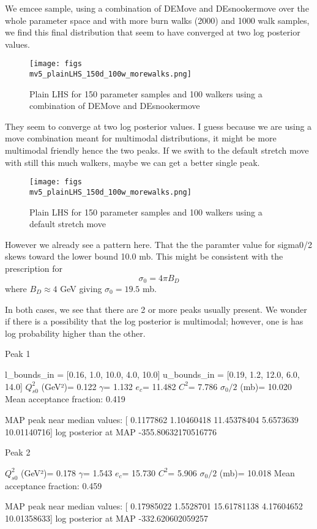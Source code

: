 \documentclass{article}
\begin{document}
We emcee sample, using a combination of DEMove and DEsnookermove over the whole parameter space and with more burn walks (2000) and 1000 walk samples, we find this final distribution that seem to have converged at two log posterior values. 

\begin{figure}
\centering
\texttt{[image: figs\\mv5\_plainLHS\_150d\_100w\_morewalks.png]}
\caption{Plain LHS for 150 parameter samples and 100 walkers using a combination of DEMove and DEsnookermove}
\end{figure}

They seem to converge at two log posterior values. I guess because we are using a move combination meant for multimodal distributions, it might be more multimodal friendly hence the two peaks. If we swith to the default stretch move with still this much walkers, maybe we can get a better single peak. 

\begin{figure}
\centering
\texttt{[image: figs\\mv5\_plainLHS\_150d\_100w\_morewalks.png]}
\caption{Plain LHS for 150 parameter samples and 100 walkers using a default stretch move}
\end{figure}

However we already see a pattern here. That the the paramter value for sigma0/2 skews toward the lower bound 10.0 mb. This might be consistent with the prescription for $$ \sigma_0 = 4\pi B_D $$ where $B_D \approx 4$ GeV giving $ \sigma_0 = 19.5 $ mb.

In both cases, we see that there are 2 or more peaks usually present. We wonder if there is a possibility that the log posterior is multimodal; however, one is has log probability higher than the other. 

Peak 1

l_bounds_in = [0.16, 1.0, 10.0, 4.0, 10.0] 
u_bounds_in = [0.19, 1.2, 12.0, 6.0, 14.0]
$Q_{s0}^{2}$ (GeV²)= 0.122
$\gamma$= 1.132
$e_c$= 11.482
$C^{2}$= 7.786
$\sigma_0/2$ (mb)= 10.020
Mean acceptance fraction: 0.419

MAP peak near median values: [ 0.1177862   1.10460418 11.45378404  5.6573639  10.01140716]
log posterior at MAP -355.80632170516776

Peak 2

$Q_{s0}^{2}$ (GeV²)= 0.178
$\gamma$= 1.543
$e_c$= 15.730
$C^{2}$= 5.906
$\sigma_0/2$ (mb)= 10.018
Mean acceptance fraction: 0.459

MAP peak near median values: [ 0.17985022  1.5528701  15.61781138  4.17604652 10.01358633]
log posterior at MAP -332.620602059257
\end{document}
